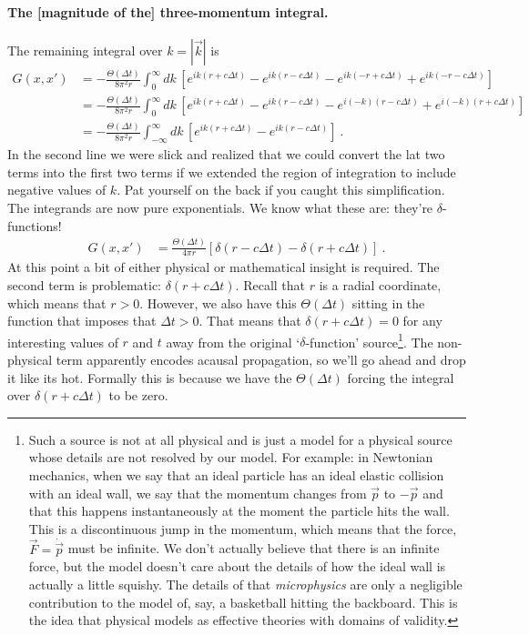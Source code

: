 \paragraph{The [magnitude of the] three-momentum integral.} The remaining integral over $k=|\vec k|$ is
\begin{align}
  G(x,x')&= -
  \frac{\Theta(\Delta t)}{8\pi^2 r} 
  \int^\infty_0
  dk\, 
  \left[
    e^{ik(r+c\Delta t)}
    - e^{ik(r-c\Delta t)}
    - e^{ik(-r+c\Delta t)}
    + e^{ik(-r-c\Delta t)}
  \right] 
  \\
  &= -
  \frac{\Theta(\Delta t)}{8\pi^2 r} 
  \int^\infty_0
  dk\, 
  \left[
    e^{ik(r+c\Delta t)}
    - e^{ik(r-c\Delta t)}
    - e^{i(-k)(r-c\Delta t)}
    + e^{i(-k)(r+c\Delta t)}
  \right] 
  \\
  &= -
  \frac{\Theta(\Delta t)}{8\pi^2 r} 
  \int^\infty_{-\infty}
  dk\, 
  \left[
    e^{ik(r+c\Delta t)}
    - e^{ik(r-c\Delta t)}
  \right] 
  \ .
\end{align}
In the second line we were slick and realized that we could convert the lat two terms into the first two terms if we extended the region of integration to include negative values of $k$. Pat yourself on the back if you caught this simplification. The integrands are now pure exponentials. We know what these are: they're $\delta$-functions!
\begin{align}
  G(x,x')
  &=
  \frac{\Theta(\Delta t)}{4\pi r} 
  \left[ \delta(r-c\Delta t) - \delta(r+c\Delta t) \right]
  \ .
\end{align}
At this point a bit of either physical or mathematical insight is required. The second term is problematic: $\delta(r+c\Delta t)$. Recall that $r$ is a radial coordinate, which means that $r>0$. However, we also have this $\Theta(\Delta t)$ sitting in the function that imposes that $\Delta t > 0$. That means that $\delta(r+c\Delta t) = 0$ for any interesting values of $r$ and $t$ away from the original `$\delta$-function' source\footnote{Such a source is not at all physical and is just a model for a physical source whose details are not resolved by our model. For example: in Newtonian mechanics, when we say that an ideal particle has an ideal elastic collision with an ideal wall, we say that the momentum changes from $\vec{p}$ to $-\vec{p}$ and that this happens instantaneously at the moment the particle hits the wall. This is a discontinuous jump in the momentum, which means that the force, $\vec{F} = \dot{\vec{p}}$ must be infinite. We don't actually believe that there is an infinite force, but the model doesn't care about the details of how the ideal wall is actually a little squishy. The details of that \emph{microphysics} are only a negligible contribution to the model of, say, a basketball hitting the backboard. This is the idea that physical models as effective theories with domains of validity.}. The non-physical term apparently encodes acausal propagation, so we'll go ahead and drop it like its hot. Formally this is because we have the $\Theta(\Delta t)$ forcing the integral over $\delta(r+c\Delta t)$ to be zero.

